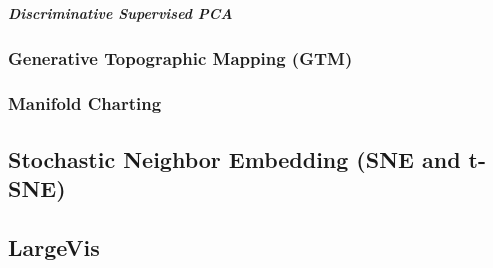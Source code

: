 \subparagraph{Discriminative Supervised PCA} 

\subsubsection{Generative Topographic Mapping (GTM)} \label{sec:GTM}


\subsubsection{Manifold Charting} \label{sec:Manifold_Charting}


\subsection{Stochastic Neighbor Embedding (SNE and t-SNE)} \label{sec:tSNE}


\subsection{LargeVis} \label{sec:largeVis}

